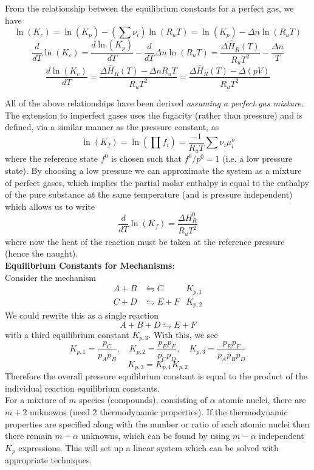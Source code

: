 \documentclass[11pt]{article}
\newcommand{\CenteredBoxed}[1]{\begin{center}\boxed{#1}\end{center}}
\begin{document}
From the relationship between the equilibrium constants for a perfect gas, we have
$$\ln(K_c) = \ln(K_p) - \left(\sum\nu_i\right)\ln(R_uT) = \ln(K_p) - \Delta n \ln(R_uT)$$
$$\frac{d}{dT}\ln(K_c) = \frac{d\ln(K_p)}{dT} - \frac{d}{dT}\Delta n\ln(R_uT) = \frac{\Delta\hat{H}_R(T)}{R_uT^2} - \frac{\Delta n}{T}$$
$$\frac{d\ln(K_c)}{dT} = \frac{\Delta\hat{H}_R(T)-\Delta nR_uT}{R_uT^2} = \frac{\Delta\hat{H}_R(T)-\Delta(pV)}{R_uT^2}$$
\CenteredBoxed{\frac{d\ln(K_c)}{dT} = \frac{\Delta\hat{U}_R(T)}{R_uT^2}}

All of the above relationships have been derived \emph{assuming a perfect gas mixture}. The extension to imperfect gases uses the fugacity (rather than pressure) and is defined, via a similar manner as the pressure constant, as
$$\ln(K_f) = \ln\left(\prod f_i\right) = \frac{-1}{R_uT}\sum\nu_i\mu_i^o$$
where the reference state $f^0$ is chosen such that $f^0/p^0=1$ (i.e. a low pressure state). By choosing a low pressure we can approximate the system as a mixture of perfect gases, which implies the partial molar enthalpy is equal to the enthalpy of the pure substance at the same temperature (and is pressure independent) which allows us to write
$$\frac{d}{dT}\ln(K_f) = \frac{\Delta H_R^0}{R_uT^2}$$
where now the heat of the reaction must be taken at the reference pressure (hence the naught).\\

\noindent\textbf{Equilibrium Constants for Mechanisms}:\\

Consider the mechanism
\begin{align*}
A + B &\leftrightharpoons C & K_{p,1}\\
C + D &\leftrightharpoons E + F & K_{p,2}
\end{align*}
We could rewrite this as a single reaction 
$$A + B + D \leftrightharpoons E + F$$
with a third equilibrium constant $K_{p,3}$. With this, we see
$$K_{p,1} = \frac{p_C}{p_Ap_B},\quad K_{p,2} = \frac{p_Ep_F}{p_Cp_D},\quad K_{p,3} = \frac{p_Ep_F}{p_Ap_Bp_D}$$
$$K_{p,3} = K_{p,1}K_{p,2}$$
Therefore the overall pressure equilibrium constant is equal to the product of the individual reaction equilibrium constants.\\

For a mixture of $m$ species (compounds), consisting of $\alpha$ atomic nuclei, there are $m+2$ unknowns (need 2 thermodynamic properties). If the thermodynamic properties are specified along with the number or ratio of each atomic nuclei then there remain $m-\alpha$ unknowns, which can be found by using $m-\alpha$ independent $K_p$ expressions. This will set up a linear system which can be solved with appropriate techniques.
\end{document}
